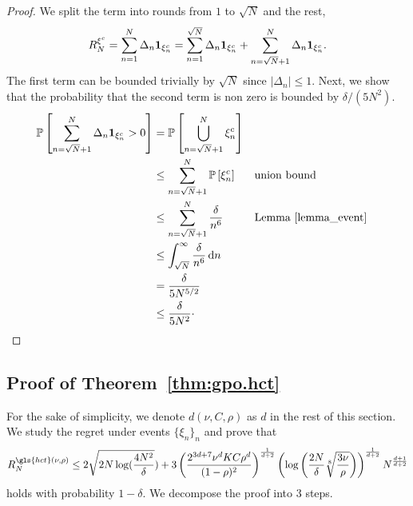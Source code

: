 \begin{proof}
We split the term into rounds from $1$ to $\sqrt{N}$ and the rest,
\[
R_N^{\xi^c} = \sum_{n=1}^N \Delta_n {\bf 1}_{\xi_n^c} = \sum_{n=1}^{\sqrt{N}} \Delta_n {\bf 1}_{\xi_n^c} + \sum_{n=\sqrt{N}+1}^N \Delta_n {\bf 1}_{\xi_n^c}.
\]
The first term can be bounded trivially by $\sqrt{N}$ since $|\Delta_n|\leq 1$. Next, we show that the probability that the second term is non zero is bounded by $\delta/(5N^2)$.
\begin{align*}
    \mathbb{P}\left[ \sum_{n=\sqrt{N}+1}^N \Delta_n {\bf 1}_{\xi_n^c} > 0 \right] & = \mathbb{P}\left[ \bigcup\limits_{n=\sqrt{N}+1}^N \xi_n^c \right]          \\
            & \leq \sum_{n=\sqrt{N}+1}^N \mathbb{P}\left[ \xi_n^c \right] && \text{union bound} \\
            & \leq \sum_{n=\sqrt{N}+1}^N \frac{\delta}{n^6} && \text{Lemma~\ref{lemma_event}} \\
            & \leq \int_{\sqrt{N}}^{\infty} \frac{\delta}{n^6} \, \mathrm{d}n \\
            & = \frac{\delta}{5N^{5/2}} \\
            & \leq \frac{\delta}{5N^2}\cdot
\end{align*}

\end{proof}

\subsection{Proof of Theorem~\ref{thm:gpo.hct}}\label{proof:thm}
\restathmhct*
\noindent
For the sake of simplicity, we denote $d(\nu,C,\rho)$ as $d$ in the rest of this section. We study the regret under events $\{\xi_n\}_n$ and prove that
\[
R_N^{\gls{hct}(\nu,\rho)} \leq 2\sqrt{2N\log(\frac{4N^2}{\delta}}) + 3\left(\frac{2^{3d+7}\nu^d KC\rho^d}{(1-\rho)^{2}}\right)^{\frac{1}{d+2}}\left(\log\left(\frac{2N}{\delta}\sqrt[8]{\frac{3\nu}{\rho}}\right)\right)^{\frac{1}{d+2}}N^{\frac{d+1}{d+2}}
\]
holds with probability $1-\delta$. We decompose the proof into 3 steps.

